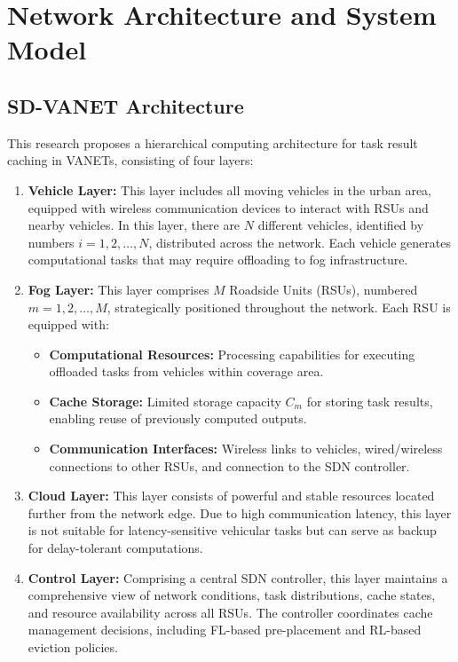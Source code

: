 \section{Network Architecture and System Model}

\subsection{SD-VANET Architecture}

This research proposes a hierarchical computing architecture for task result caching in VANETs, consisting of four layers:

\begin{enumerate}
    \item \textbf{Vehicle Layer:} This layer includes all moving vehicles in the urban area, equipped with wireless communication devices to interact with RSUs and nearby vehicles. In this layer, there are $N$ different vehicles, identified by numbers $i = 1, 2, \ldots, N$, distributed across the network. Each vehicle generates computational tasks that may require offloading to fog infrastructure.
    
    \item \textbf{Fog Layer:} This layer comprises $M$ Roadside Units (RSUs), numbered $m = 1, 2, \ldots, M$, strategically positioned throughout the network. Each RSU is equipped with:
    \begin{itemize}
        \item \textbf{Computational Resources:} Processing capabilities for executing offloaded tasks from vehicles within coverage area.
        \item \textbf{Cache Storage:} Limited storage capacity $C_m$ for storing task results, enabling reuse of previously computed outputs.
        \item \textbf{Communication Interfaces:} Wireless links to vehicles, wired/wireless connections to other RSUs, and connection to the SDN controller.
    \end{itemize}
    
    \item \textbf{Cloud Layer:} This layer consists of powerful and stable resources located further from the network edge. Due to high communication latency, this layer is not suitable for latency-sensitive vehicular tasks but can serve as backup for delay-tolerant computations.
    
    \item \textbf{Control Layer:} Comprising a central SDN controller, this layer maintains a comprehensive view of network conditions, task distributions, cache states, and resource availability across all RSUs. The controller coordinates cache management decisions, including FL-based pre-placement and RL-based eviction policies.
\end{enumerate}

